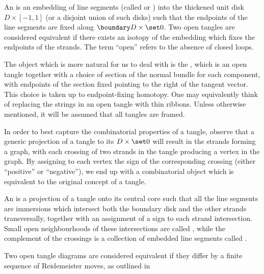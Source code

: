 \begin{definition}
        An  is an embedding of line segments (called
         or ) into the thickened unit disk
        $D \times [-1,1]$ (or a disjoint union of such disks) such that the
        endpoints of the line segments are fixed along
        $\boundary D \times \set0$. Two open tangles are considered equivalent
        if there exists an isotopy of the embedding which fixes the endpoints of
        the strands. The term \enquote{open} refers to the absence of closed
        loops.
\end{definition}

\begin{definition}
        The object which is more natural for us to deal with is the , which is an open tangle together with a choice of section of
        the normal bundle for each component, with endpoints of the section
        fixed pointing to the right of the tangent vector. This choice is taken
        up to endpoint-fixing homotopy. One may equivalently think of replacing
        the strings in an open tangle with thin ribbons. Unless otherwise
        mentioned, it will be assumed that all tangles are framed.
\end{definition}

In order to best capture the combinatorial properties of a tangle, observe that
a generic projection of a tangle to its  $D\times \set 0$
will result in the strands forming a graph, with each crossing of two strands in
the tangle producing a vertex in the graph. By assigning to each vertex the sign
of the corresponding crossing (either \enquote{positive} or \enquote{negative}),
we end up with a combinatorial object which is equivalent to the original
concept of a tangle.

\begin{definition}\label{def:open_tangle_diagram}
        An  is a projection of a tangle onto its
        central core such that all the line segments are immersions which
        intersect both the boundary disk and the other strands transversally,
        together with an assignment of a sign to each strand intersection.
        Small open neighbourhoods of these intersections are called
        , while the complement of the crossings is a collection
        of embedded line segments called .

        Two open tangle diagrams are considered equivalent if they differ by a
        finite sequence of Reidemeister moves, as outlined in
\end{definition}

